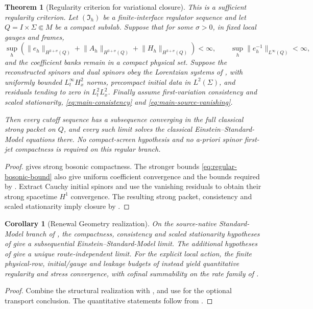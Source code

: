 \documentclass[11pt]{article}
\numberwithin{equation}{section}
\newtheorem{theorem}{Theorem}[section]
\newtheorem{corollary}[corollary]{Corollary}
\theoremstyle{definition}
\theoremstyle{remark}
\newcommand{\norm}[1]{\lVert#1\rVert}
\newcommand{\Iface}{\mathfrak I}
\begin{document}
\begin{theorem}[Regularity criterion for variational closure]
\label{thm:regular-branch}
This is a sufficient regularity criterion.
Let $(\Iface_h)$ be a finite-interface regulator sequence and let $Q=I\times\Sigma\Subset M$ be a compact subslab. Suppose that for some $\sigma>0$, in fixed local gauges and frames,
\begin{equation}
 \sup_h\left(
 \norm{e_h}_{H^{3+\sigma}(Q)}
 +\norm{A_h}_{H^{3+\sigma}(Q)}
 +\norm{H_h}_{H^{3+\sigma}(Q)}
 \right)<\infty,
 \qquad
 \sup_h\norm{e_h^{-1}}_{L^\infty(Q)}<\infty,
 \label{eq:regular-bosonic-bound}
\end{equation}
and the coefficient banks remain in a compact physical set. Suppose the reconstructed spinors and dual spinors obey the Lorentzian systems of , with uniformly bounded $L^\infty_tH^2_x$ norms, precompact initial data in $L^2(\Sigma)$, and residuals tending to zero in $L^2_tL^2_x$. Finally assume first-variation consistency and scaled stationarity, \eqref{eq:main-consistency} and \eqref{eq:main-source-vanishing}.

Then every cutoff sequence has a subsequence converging in the full classical strong packet on $Q$, and every such limit solves the classical Einstein--Standard-Model equations there. No compact-screen hypothesis and no a-priori spinor first-jet compactness is required on this regular branch.
\end{theorem}
\begin{proof}
 gives strong bosonic compactness.
The stronger bounds \eqref{eq:regular-bosonic-bound} also give uniform
coefficient convergence and the bounds required by
. Extract Cauchy initial spinors and use the
vanishing residuals to obtain their strong spacetime $H^1$ convergence.
The resulting strong packet, consistency and scaled stationarity imply
closure by .
\end{proof}

\begin{corollary}[Renewal Geometry realization]
\label{cor:renewal-realization}
On the source-native Standard-Model branch of
, the compactness, consistency and scaled
stationarity hypotheses of  give a subsequential
Einstein--Standard-Model limit. The additional hypotheses of
 give a unique route-independent limit.
For the explicit local action, the finite physical-row, initial/gauge and
leakage budgets of  instead yield quantitative
regularity and stress convergence, with cofinal summability on the rate
family of .
\end{corollary}
\begin{proof}
Combine the structural realization  with
, and use  for the optional
transport conclusion. The quantitative statements follow from
.
\end{proof}
\end{document}
